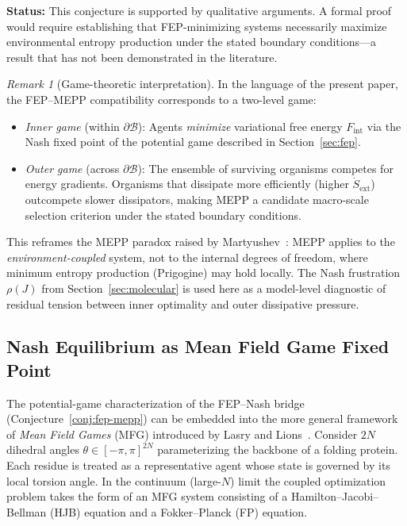 \documentclass[12pt,a4paper]{article}
\theoremstyle{remark}
\newtheorem{remark}{Remark}
\begin{document}
\noindent\textbf{Status:} This conjecture is supported by qualitative arguments. A formal proof would require establishing that FEP-minimizing systems necessarily maximize environmental entropy production under the stated boundary conditions---a result that has not been demonstrated in the literature.

\begin{remark}[Game-theoretic interpretation]
In the language of the present paper, the FEP--MEPP compatibility
corresponds to a two-level game:
\begin{itemize}
  \item \emph{Inner game} (within $\partial\mathcal{B}$): Agents
    \emph{minimize} variational free energy $F_{\mathrm{int}}$ via the
    Nash fixed point of the potential game described in
    Section~\ref{sec:fep}.
  \item \emph{Outer game} (across $\partial\mathcal{B}$):
    The ensemble of surviving organisms competes for energy
    gradients. Organisms that dissipate more efficiently
    (higher $\dot{S}_{\mathrm{ext}}$) outcompete slower
    dissipators, making MEPP a candidate macro-scale selection
    criterion under the stated boundary conditions.
\end{itemize}
This reframes the MEPP paradox raised by
Martyushev~\cite{Martyushev2010}: MEPP applies to the
\emph{environment-coupled} system, not to the internal degrees
of freedom, where minimum entropy production (Prigogine) may
hold locally. The Nash frustration $\rho(J)$ from
Section~\ref{sec:molecular} is used here as a model-level diagnostic of residual tension
between inner optimality and outer dissipative pressure.
\end{remark}

\subsection{Nash Equilibrium as Mean Field Game Fixed Point}\label{sec:mfg-fixpoint}

The potential-game characterization of the FEP--Nash bridge (Conjecture~\ref{conj:fep-mepp}) can be embedded into the more general framework of \emph{Mean Field Games} (MFG) introduced by Lasry and Lions~\cite{LasryLions2007}. Consider $2N$ dihedral angles $\theta\in[-\pi,\pi]^{2N}$ parameterizing the backbone of a folding protein. Each residue is treated as a representative agent whose state is governed by its local torsion angle. In the continuum (large-$N$) limit the coupled optimization problem takes the form of an MFG system consisting of a Hamilton--Jacobi--Bellman (HJB) equation and a Fokker--Planck (FP) equation.
\end{document}
